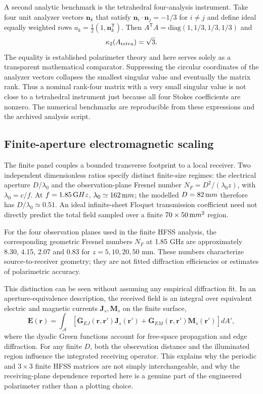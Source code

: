 \documentclass{ieeeaccess}
\begin{document}
A second analytic benchmark is the tetrahedral four-analysis instrument. Take four unit analyzer vectors $\boldsymbol n_k$ that satisfy $\boldsymbol n_i\cdot\boldsymbol n_j=-1/3$ for $i\ne j$ and define ideal equally weighted rows $a_k=\tfrac12(1,\boldsymbol n_k^{\mathsf T})$. Then $A^{\mathsf T}A=\mathrm{diag}(1,1/3,1/3,1/3)$ and
\begin{equation}
\kappa_2(A_{\rm tetra})=\sqrt{3}.
\label{eq:tetra}
\end{equation}
The equality is established polarimeter theory and here serves solely as a transparent mathematical comparator. Suppressing the circular coordinates of the analyzer vectors collapses the smallest singular value and eventually the matrix rank. Thus a nominal rank-four matrix with a very small singular value is not close to a tetrahedral instrument just because all four Stokes coefficients are nonzero. The numerical benchmarks are reproducible from these expressions and the archived analysis script.



\subsection{Finite-aperture electromagnetic scaling}
The finite panel couples a bounded transverse footprint to a local receiver. Two independent dimensionless ratios specify distinct finite-size regimes: the electrical aperture $D/\lambda_0$ and the observation-plane Fresnel number $N_F=D^2/(\lambda_0 z)$, with $\lambda_0=c/f$. At $f=1.85\,{\rm GHz}$, $\lambda_0\simeq162\,{\rm mm}$; the modelled $D=82\,{\rm mm}$ therefore has $D/\lambda_0\simeq0.51$. An ideal infinite-sheet Floquet transmission coefficient need not directly predict the total field sampled over a finite $70\times50\,{\rm mm}^2$ region.

For the four observation planes used in the finite HFSS analysis, the corresponding geometric Fresnel numbers \(N_F\) at 1.85 GHz are approximately 8.30, 4.15, 2.07 and 0.83 for \(z=5,10,20,50\) mm. These numbers characterize source-to-receiver geometry; they are not fitted diffraction efficiencies or estimates of polarimetric accuracy. 

This distinction can be seen without assuming any empirical diffraction fit. In an aperture-equivalence description, the received field is an integral over equivalent electric and magnetic currents $\mathbf J_s,\mathbf M_s$ on the finite surface,
\begin{equation}
\mathbf E(\mathbf r)=\int_{\mathcal A}\left[\overline{\mathbf G}_{EJ}(\mathbf r,\mathbf r')\mathbf J_s(\mathbf r')+\overline{\mathbf G}_{EM}(\mathbf r,\mathbf r')\mathbf M_s(\mathbf r')\right]dA',
\label{eq:finite_aperture}
\end{equation}
where the dyadic Green functions account for free-space propagation and edge diffraction. For any finite $D$, both the observation distance and the illuminated region influence the integrated receiving operator. This explains why the periodic and $3\times3$ finite HFSS matrices are not simply interchangeable, and why the receiving-plane dependence reported here is a genuine part of the engineered polarimeter rather than a plotting choice.
\end{document}
